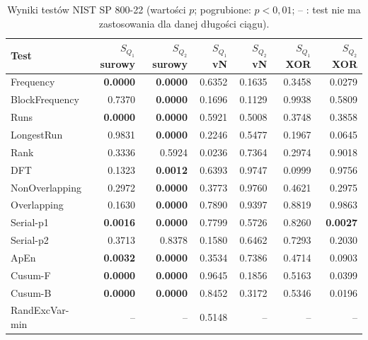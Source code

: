 \begin{table}[htbp]
\centering
\small
\begin{tabular}{lrrrrrr}
\toprule
Test & $S_{Q_1}$ surowy & $S_{Q_2}$ surowy & $S_{Q_1}$ vN & $S_{Q_2}$ vN & $S_{Q_1}$ XOR & $S_{Q_2}$ XOR \\
\midrule
Frequency & \textbf{0.0000} & \textbf{0.0000} & 0.6352 & 0.1635 & 0.3458 & 0.0279 \\
BlockFrequency & 0.7370 & \textbf{0.0000} & 0.1696 & 0.1129 & 0.9938 & 0.5809 \\
Runs & \textbf{0.0000} & \textbf{0.0000} & 0.5921 & 0.5008 & 0.3748 & 0.3858 \\
LongestRun & 0.9831 & \textbf{0.0000} & 0.2246 & 0.5477 & 0.1967 & 0.0645 \\
Rank & 0.3336 & 0.5924 & 0.0236 & 0.7364 & 0.2974 & 0.9018 \\
DFT & 0.1323 & \textbf{0.0012} & 0.6393 & 0.9747 & 0.0999 & 0.9756 \\
NonOverlapping & 0.2972 & \textbf{0.0000} & 0.3773 & 0.9760 & 0.4621 & 0.2975 \\
Overlapping & 0.1630 & \textbf{0.0000} & 0.7890 & 0.9397 & 0.8819 & 0.9863 \\
Serial-p1 & \textbf{0.0016} & \textbf{0.0000} & 0.7799 & 0.5726 & 0.8260 & \textbf{0.0027} \\
Serial-p2 & 0.3713 & 0.8378 & 0.1580 & 0.6462 & 0.7293 & 0.2030 \\
ApEn & \textbf{0.0032} & \textbf{0.0000} & 0.3534 & 0.7386 & 0.4714 & 0.0903 \\
Cusum-F & \textbf{0.0000} & \textbf{0.0000} & 0.9645 & 0.1856 & 0.5163 & 0.0399 \\
Cusum-B & \textbf{0.0000} & \textbf{0.0000} & 0.8452 & 0.3172 & 0.5346 & 0.0196 \\
RandExcVar-min & -- & -- & 0.5148 & -- & -- & -- \\
\bottomrule
\end{tabular}
\caption{Wyniki testów NIST SP 800-22 (wartości $p$; pogrubione: $p<0{,}01$; -- : test nie ma zastosowania dla danej długości ciągu).}
\label{tab:eqrng_nist}
\end{table}
